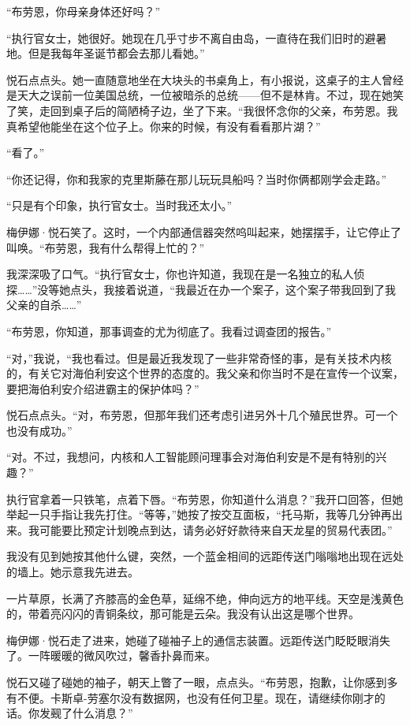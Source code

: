 \documentclass[AutoFakeBold=true]{book}
\begin{document}
``布劳恩，你母亲身体还好吗？''

``执行官女士，她很好。她现在几乎寸步不离自由岛，一直待在我们旧时的避暑地。但是我每年圣诞节都会去那儿看她。''

悦石点点头。她一直随意地坐在大块头的书桌角上，有小报说，这桌子的主人曾经是天大之误前一位美国总统，一位被暗杀的总统——但不是林肯。不过，现在她笑了笑，走回到桌子后的简陋椅子边，坐了下来。``我很怀念你的父亲，布劳恩。我真希望他能坐在这个位子上。你来的时候，有没有看看那片湖？''

``看了。''

``你还记得，你和我家的克里斯藤在那儿玩玩具船吗？当时你俩都刚学会走路。''

``只是有个印象，执行官女士。当时我还太小。''

梅伊娜·悦石笑了。这时，一个内部通信器突然呜叫起来，她摆摆手，让它停止了叫唤。``布劳恩，我有什么帮得上忙的？''

我深深吸了口气。``执行官女士，你也许知道，我现在是一名独立的私人侦探……''没等她点头，我接着说道，``我最近在办一个案子，这个案子带我回到了我父亲的自杀……''

``布劳恩，你知道，那事调查的尤为彻底了。我看过调查团的报告。''

``对，''我说，``我也看过。但是最近我发现了一些非常奇怪的事，是有关技术内核的，有关它对海伯利安这个世界的态度的。我父亲和你当时不是在宣传一个议案，要把海伯利安介绍进霸主的保护体吗？''

悦石点点头。``对，布劳恩，但那年我们还考虑引进另外十几个殖民世界。可一个也没有成功。''

``对。不过，我想问，内核和人工智能顾问理事会对海伯利安是不是有特别的兴趣？''

执行官拿着一只铁笔，点着下唇。``布劳恩，你知道什么消息？''我开口回答，但她举起一只手指让我先打住。``等等，''她按了按交互面板，``托马斯，我等几分钟再出来。我可能要比预定计划晚点到达，请务必好好款待来自天龙星的贸易代表团。''

我没有见到她按其他什么键，突然，一个蓝金相间的远距传送门嗡嗡地出现在远处的墙上。她示意我先进去。

一片草原，长满了齐膝高的金色草，延绵不绝，伸向远方的地平线。天空是浅黄色的，带着亮闪闪的青铜条纹，那可能是云朵。我没有认出这是哪个世界。

梅伊娜·悦石走了进来，她碰了碰袖子上的通信志装置。远距传送门眨眨眼消失了。一阵暖暖的微风吹过，馨香扑鼻而来。

悦石又碰了碰她的袖子，朝天上瞥了一眼，点点头。``布劳恩，抱歉，让你感到多有不便。卡斯卓-劳塞尔没有数据网，也没有任何卫星。现在，请继续你刚才的话。你发觋了什么消息？''
\end{document}
